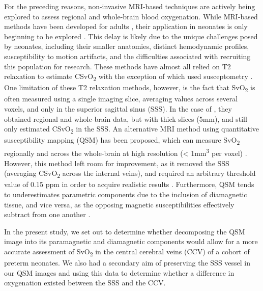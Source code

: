 \documentclass[
true
]{sn-jnl}
\begin{document}
For the preceding reasons, non-invasive MRI-based techniques are
actively being explored to assess regional and whole-brain blood
oxygenation. While MRI-based methods have been developed for adults
\citep{jainRapidMagneticResonance2011, luQuantitativeEvaluationOxygenation2008, xuNoninvasiveQuantificationWholebrain2009},
their application in neonates is only beginning to be explored
\citep{devisNoninvasiveMRIMeasurements2014, liuQuantitativeAssessmentGlobal2014, qiHemodynamicMetabolicAssessment2018, jainCerebralOxygenMetabolism2014, jiangVesselspecificQuantificationNeonatal2019}.
This delay is likely due to the unique challenges posed by neonates,
including their smaller anatomies, distinct hemodynamic profiles,
susceptibility to motion artifacts, and the difficulties associated with
recruiting this population for research. These methods have almost all
relied on T2 relaxation to estimate CSvO\textsubscript{2}
\citep{devisNoninvasiveMRIMeasurements2014, liuQuantitativeAssessmentGlobal2014, qiHemodynamicMetabolicAssessment2018, jiangVesselspecificQuantificationNeonatal2019}
with the exception of \citet{jainCerebralOxygenMetabolism2014} which
used susceptometry \citep{jainMRIEstimationGlobal2010}. One limitation
of these T2 relaxation methods, however, is the fact that
SvO\textsubscript{2} is often measured using a single imaging slice,
averaging values across several voxels, and only in the superior
sagittal sinus (SSS). In the case of
\citet{jainCerebralOxygenMetabolism2014}, they obtained regional and
whole-brain data, but with thick slices (5mm), and still only estimated
CSvO\textsubscript{2} in the SSS. An alternative MRI method using
quantitative susceptibility mapping (QSM) has been proposed, which can
measure SvO\textsubscript{2} regionally and across the whole-brain at
high resolution (\textless{} 1mm\textsuperscript{3} per voxel)
\citep{weberQuantitativeSusceptibilityMapping2021}. However, this method
left room for improvement, as it removed the SSS (averaging
CSvO\textsubscript{2} across the internal veins), and required an
arbitrary threshold value of 0.15 ppm in order to acquire realistic
results \citep{weberQuantitativeSusceptibilityMapping2021}. Furthermore,
QSM tends to underestimates parametric components due to the inclusion
of diamagnetic tissue, and vice versa, as the opposing magnetic
susceptibilities effectively subtract from one another
\citep{kimHSeparationImagingDiagnosis2023}.

In the present study, we set out to determine whether decomposing the
QSM image into its paramagnetic and diamagnetic components would allow
for a more accurate assessment of SvO\textsubscript{2} in the central
cerebral veins (CCV) of a cohort of preterm neonates. We also had a
secondary aim of preserving the SSS vessel in our QSM images and using
this data to determine whether a difference in oxygenation existed
between the SSS and the CCV.
\end{document}
